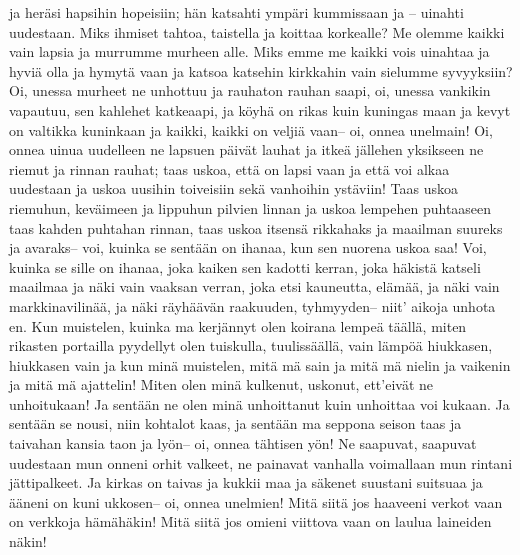     ja heräsi hapsihin hopeisiin;
    hän katsahti ympäri kummissaan
    ja -- uinahti uudestaan.
    Miks ihmiset tahtoa, taistella
    ja koittaa korkealle?
    Me olemme kaikki vain lapsia
    ja murrumme murheen alle.
    Miks emme me kaikki vois uinahtaa
    ja hyviä olla ja hymytä vaan
    ja katsoa katsehin kirkkahin
    vain sielumme syvyyksiin?
  \endverse
  \beginverse
    Oi, unessa murheet ne unhottuu
    ja rauhaton rauhan saapi,
    oi, unessa vankikin vapautuu,
    sen kahlehet katkeaapi,
    ja köyhä on rikas kuin kuningas maan
    ja kevyt on valtikka kuninkaan
    ja kaikki, kaikki on veljiä vaan--
    oi, onnea unelmain!
  \endverse
  \beginverse
    Oi, onnea uinua uudelleen
    ne lapsuen päivät lauhat
    ja itkeä jällehen yksikseen
    ne riemut ja rinnan rauhat;
    taas uskoa, että on lapsi vaan
    ja että voi alkaa uudestaan
    ja uskoa uusihin toiveisiin
    sekä vanhoihin ystäviin!
  \endverse
  \beginverse
    Taas uskoa riemuhun, keväimeen
    ja lippuhun pilvien linnan
    ja uskoa lempehen puhtaaseen
    taas kahden puhtahan rinnan,
    taas uskoa itsensä rikkahaks
    ja maailman suureks ja avaraks--
    voi, kuinka se sentään on ihanaa,
    kun sen nuorena uskoa saa!
  \endverse
  \beginverse
    Voi, kuinka se sille on ihanaa,
    joka kaiken sen kadotti kerran,
    joka häkistä katseli maailmaa
    ja näki vain vaaksan verran,
    joka etsi kauneutta, elämää,
    ja näki vain markkinavilinää,
    ja näki räyhäävän raakuuden, tyhmyyden--
    niit' aikoja unhota en.
  \endverse
  \beginverse
    Kun muistelen, kuinka ma kerjännyt
    olen koirana lempeä täällä,
    miten rikasten portailla pyydellyt
    olen tuiskulla, tuulissäällä,
    vain lämpöä hiukkasen, hiukkasen vain
    ja kun minä muistelen, mitä mä sain
    ja mitä mä nielin ja vaikenin
    ja mitä mä ajattelin!
  \endverse
  \beginverse
    Miten olen minä kulkenut, uskonut,
    ett'eivät ne unhoitukaan!
    Ja sentään ne olen minä unhoittanut
    kuin unhoittaa voi kukaan.
    Ja sentään se nousi, niin kohtalot kaas,
    ja sentään ma seppona seison taas
    ja taivahan kansia taon ja lyön--
    oi, onnea tähtisen yön!
  \endverse
  \beginverse
    Ne saapuvat, saapuvat uudestaan
    mun onneni orhit valkeet,
    ne painavat vanhalla voimallaan
    mun rintani jättipalkeet.
    Ja kirkas on taivas ja kukkii maa
    ja säkenet suustani suitsuaa
    ja ääneni on kuni ukkosen--
    oi, onnea unelmien!
  \endverse
  \beginverse
    Mitä siitä jos haaveeni verkot vaan
    on verkkoja hämähäkin!
    Mitä siitä jos omieni viittova vaan
    on laulua laineiden näkin!
